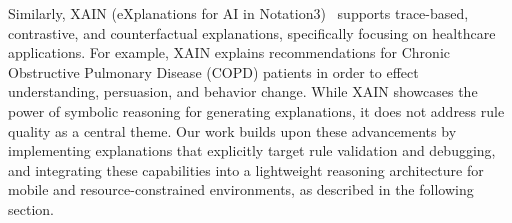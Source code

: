 Similarly, XAIN (eXplanations for AI in Notation3)~\cite{vanwoensel2023explanations} supports trace-based, contrastive, and counterfactual explanations, specifically focusing on healthcare applications. For example, XAIN explains recommendations for Chronic Obstructive Pulmonary Disease (COPD) patients in order to effect understanding, persuasion, and behavior change. 
While XAIN showcases the power of symbolic reasoning for generating explanations, it does not address rule quality as a central theme. Our work builds upon these advancements by implementing explanations that explicitly target rule validation and debugging, %
and integrating these capabilities into a lightweight reasoning architecture for mobile and resource-constrained environments, as described in the following section.

